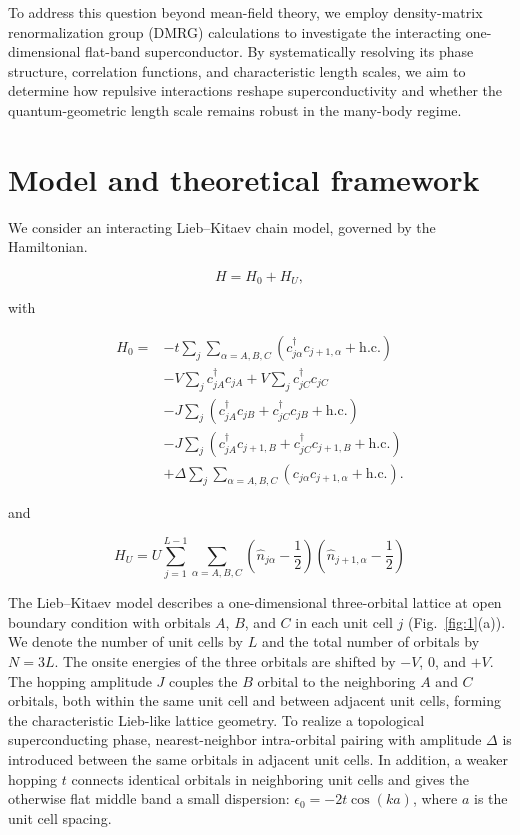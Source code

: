 \documentclass[
  prb,
  reprint,
  superscriptaddress,
  amsmath,
  amssymb,
  longbibliography
]{revtex4-2}
\begin{document}
To address this question beyond mean-field theory, we employ density-matrix renormalization group (DMRG) calculations to investigate the interacting one-dimensional flat-band superconductor. By systematically resolving its phase structure, correlation functions, and characteristic length scales, we aim to determine how repulsive interactions reshape superconductivity and whether the quantum-geometric length scale remains robust in the many-body regime.


\section{Model and theoretical framework}
\label{sec:model}

We consider an interacting Lieb--Kitaev chain model, governed by the Hamiltonian.

\begin{equation}
H = H_0 + H_U,
\end{equation}

with

\begin{align}
H_0
={}&-t\sum_j\sum_{\alpha=A,B,C}
\left(
c_{j\alpha}^{\dagger}c_{j+1,\alpha}
+\mathrm{h.c.}
\right)
\nonumber\\
&-V\sum_j c_{jA}^{\dagger}c_{jA}
+V\sum_j c_{jC}^{\dagger}c_{jC}
\nonumber\\
&-J\sum_j
\left(
c_{jA}^{\dagger}c_{jB}
+c_{jC}^{\dagger}c_{jB}
+\mathrm{h.c.}
\right)
\nonumber\\
&-J\sum_j
\left(
c_{jA}^{\dagger}c_{j+1,B}
+c_{jC}^{\dagger}c_{j+1,B}
+\mathrm{h.c.}
\right)
\nonumber\\
&+\Delta\sum_j\sum_{\alpha=A,B,C}
\left(
c_{j\alpha}c_{j+1,\alpha}
+\mathrm{h.c.}
\right).
\end{align}

and 

\begin{equation}
H_U = U \sum_{j=1}^{L-1}\sum_{\alpha=A,B,C}
\left(\hat{n}_{j\alpha}-\frac{1}{2}\right)
\left(\hat{n}_{j+1,\alpha}-\frac{1}{2}\right)
\end{equation}

The Lieb--Kitaev model describes a one-dimensional three-orbital lattice at open boundary condition with orbitals \(A\), \(B\), and \(C\) in each unit cell $j$ (Fig.~\ref{fig:1}(a)). We denote the number of unit cells by $L$ and the total number of orbitals by $N=3L$. The onsite energies of the three orbitals are shifted by \(-V\), \(0\), and \(+V\). The hopping amplitude \(J\) couples the \(B\) orbital to the neighboring \(A\) and \(C\) orbitals, both within the same unit cell and between adjacent unit cells, forming the characteristic Lieb-like lattice geometry. To realize a topological superconducting phase, nearest-neighbor intra-orbital pairing with amplitude \(\Delta\) is introduced between the same orbitals in adjacent unit cells. In addition, a weaker hopping \(t\) connects identical orbitals in neighboring unit cells and gives the otherwise flat middle band a small dispersion: $\epsilon_0= -2t \cos(ka)$, where $a$ is the unit cell spacing.
\end{document}
